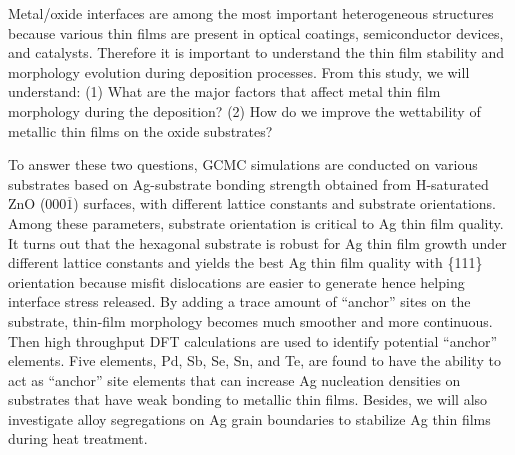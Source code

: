 Metal/oxide interfaces are among the most important heterogeneous structures because various thin films are present in optical coatings, semiconductor devices, and catalysts. Therefore it is important to understand the thin film stability and morphology evolution during deposition processes. From this study, we will understand: (1) What are the major factors that affect metal thin film morphology during the deposition? (2) How do we improve the wettability of metallic thin films on the oxide substrates?

To answer these two questions, \ac{GCMC} simulations are conducted on various substrates based on Ag-substrate bonding strength obtained from H-saturated ZnO (000$\overline{1}$) surfaces, with different lattice constants and substrate orientations. Among these parameters, substrate orientation is critical to Ag thin film quality. It turns out that the hexagonal substrate is robust for Ag thin film growth under different lattice constants and yields the best Ag thin film quality with \{111\} orientation because misfit dislocations are easier to generate hence helping interface stress released. By adding a trace amount of ``anchor'' sites on the substrate, thin-film morphology becomes much smoother and more continuous. Then high throughput \ac{DFT} calculations are used to identify potential ``anchor'' elements. Five elements, Pd, Sb, Se, Sn, and Te, are found to have the ability to act as ``anchor'' site elements that can increase Ag nucleation densities on substrates that have weak bonding to metallic thin films. Besides, we will also investigate alloy segregations on Ag grain boundaries to stabilize Ag thin films during heat treatment.






